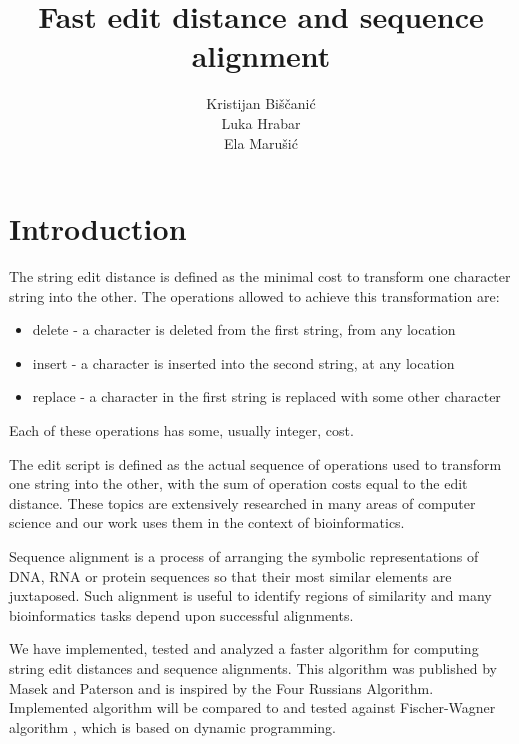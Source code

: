\documentclass[times, utf8, seminar, numeric]{fer}
\begin{document}
\title{Fast edit distance and sequence alignment}

\author{Kristijan Biščanić \\ Luka Hrabar \\ Ela Marušić}

\maketitle

\tableofcontents

\chapter{Introduction}
The string edit distance is defined as the minimal cost to transform one character string into the other. The operations allowed to achieve this transformation are:
\begin{itemize}
\item delete - a character is deleted from the first string, from any location
\item insert - a character is inserted into the second string, at any location
\item replace - a character in the first string is replaced with some other character
\end{itemize}
Each of these operations has some, usually integer, cost.

The edit script is defined as the actual sequence of operations used to transform one string into the other, with the sum of operation costs equal to the edit distance. These topics are extensively researched in many areas of computer science and our work uses them in the context of bioinformatics.

Sequence alignment is a process of arranging the symbolic representations of DNA, RNA or protein sequences so that their most similar elements are juxtaposed. Such alignment is useful to identify regions of similarity and many bioinformatics tasks depend upon successful alignments.

We have implemented, tested and analyzed a faster algorithm for computing string edit distances and sequence alignments. This algorithm was published by Masek and Paterson \cite{masek1980faster} and is inspired by the Four Russians Algorithm. Implemented algorithm will be compared to and tested against Fischer-Wagner algorithm \cite{needleman1970general}, which is based on dynamic programming.
\end{document}

